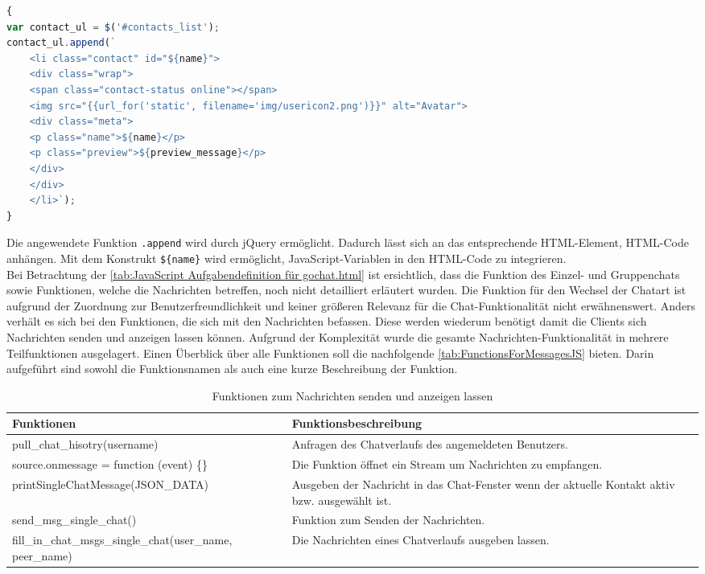\documentclass[a4paper,titlepage,halfparskip,12pt]{scrreprt}
\begin{document}
\begin{onehalfspacing}
\begin{lstlisting}[language=Javascript,caption=Hinzufügen des Kontaktes mithilfe von HTML-Elementen,label={lst:AddContacttoList}]
{
var contact_ul = $('#contacts_list');
contact_ul.append(`
	<li class="contact" id="${name}">
	<div class="wrap">
	<span class="contact-status online"></span>
	<img src="{{url_for('static', filename='img/usericon2.png')}}" alt="Avatar">
	<div class="meta">
	<p class="name">${name}</p>
	<p class="preview">${preview_message}</p>
	</div>
	</div>
	</li>`);
}
\end{lstlisting}  
Die angewendete Funktion \texttt{.append} wird durch jQuery ermöglicht. Dadurch lässt sich an das entsprechende HTML-Element, HTML-Code anhängen. Mit dem Konstrukt \texttt{\$\{name\}} wird ermöglicht, JavaScript-Variablen in den HTML-Code zu integrieren.\\ 
Bei Betrachtung der \autoref{tab:JavaScript Aufgabendefinition für gochat.html} ist ersichtlich, dass die Funktion des Einzel- und Gruppenchats sowie Funktionen, welche die Nachrichten betreffen, noch nicht detailliert erläutert wurden. Die Funktion für den Wechsel der Chatart ist aufgrund der Zuordnung zur Benutzerfreundlichkeit und keiner größeren Relevanz für die Chat-Funktionalität nicht erwähnenswert. Anders verhält es sich bei den Funktionen, die sich mit den Nachrichten befassen. Diese werden wiederum benötigt damit die Clients sich Nachrichten senden und anzeigen lassen können. Aufgrund der Komplexität wurde die gesamte Nachrichten-Funktionalität in mehrere Teilfunktionen ausgelagert. Einen Überblick über alle Funktionen soll die nachfolgende \autoref{tab:FunctionsForMessagesJS} bieten. Darin aufgeführt sind sowohl die Funktionsnamen als auch eine kurze Beschreibung der Funktion.
\begin{table}[h]
	\centering
	\caption{Funktionen zum Nachrichten senden und anzeigen lassen}
	\begin{tabular}{|p{6cm}|p{8.8cm}|}
		\hline
		\textbf{Funktionen} & \textbf{Funktionsbeschreibung} \\
		\hline
		pull\_chat\_hisotry(username) & Anfragen des Chatverlaufs des angemeldeten Benutzers.\\
		\hline
		source.onmessage = function (event) \{\} & Die Funktion öffnet ein \glqq Stream\grqq{} um Nachrichten zu empfangen.\\
		\hline
		printSingleChatMessage\linebreak(JSON\_DATA) & Ausgeben der Nachricht in das Chat-Fenster wenn der aktuelle Kontakt aktiv bzw. ausgewählt ist.\\
		\hline
		send\_msg\_single\_chat() & Funktion zum Senden der Nachrichten.\\
		\hline
		fill\_in\_chat\_msgs\_single\_chat\linebreak(user\_name, peer\_name) & Die Nachrichten eines Chatverlaufs ausgeben lassen.\\
		\hline
	\end{tabular}
	\label{tab:FunctionsForMessagesJS}
\end{table}


\end{onehalfspacing}
\end{document}
